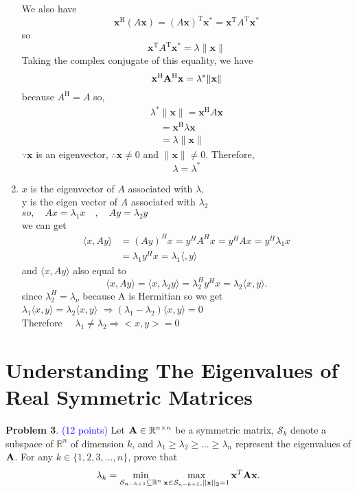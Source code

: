 \documentclass[english,onecolumn]{IEEEtran}
\newcommand{\Rbb}{\mathbb{R}}
\newcommand{\bigS}{\mathcal{S}}
\newcommand{\bA}{{\bf A}}
\newcommand{\bx}{{\bf x}}
\begin{document}
\begin{enumerate}
$$    $$
    We also have
    $$
    \mathbf{x}^{\mathrm{H}}(A \mathbf{x})=(A \mathbf{x})^{\mathrm{T}} \mathbf{x}^{*}=\mathbf{x}^{\mathrm{T}} A^{\mathrm{T}} \mathbf{x}^{*}
    $$
    so
    $$
    \mathbf{x}^{\mathrm{T}} A^{\mathrm{T}} \mathbf{x}^{*}=\lambda\|\mathbf{x}\|
    $$
    Taking the complex conjugate of this equality, we have
    $$
    \mathbf{x}^{\mathrm{H}} \bold{A}^{\mathrm{H}} \mathbf{x}=\lambda^{*}\|\mathbf{x}\|
    $$
    because $A^{\mathrm{H}}=A$ so,
    $$
    \begin{array}{l}
    	\lambda^{*}\|\mathbf{x}\| = \mathbf{x}^{\mathrm{H}} A \mathbf{x} \\
    	\quad = \mathbf{x}^{\mathrm{H}} \lambda \mathbf{x} \\
    	\quad=\lambda\|\mathbf{x}\|
    \end{array}
    $$
    $\because \mathbf{x}$ is an eigenvector, $\therefore \mathbf{x}\ne 0$ and  $\|\mathbf{x}\| \neq 0$.
    Therefore,
    $$
    \lambda=\lambda^{*}
    $$
    
    
    
    
    
    \item
    $x$ is the eigenvector of $A$ associated with $\lambda$,\\
    y is the eigen vector of $A$ associated with $\lambda_{2}$\\
    $so, \quad A x=\lambda_{1} x \quad, \quad A y=\lambda_{2} y$\\
    we can get
    $$
    \begin{aligned}
    	\langle x, A y\rangle &=(A y)^{H} x=y^{H} A^{H} x=y^{H} A x=y^{H} \lambda_{1} x \\
    	&=\lambda_{1} y^{H} x=\lambda_{1}\langle, y\rangle
    \end{aligned}
    $$
    and $\langle x, A y\rangle$ also equal to
    $$
    \langle x, A y\rangle=\langle x, \lambda_{2} y\rangle=\lambda_{2}^{H} y^{H} x=\lambda_{2}\langle x, y\rangle.
    $$
    since $\lambda_{2}^{H}=\lambda_{\nu}$ because A is Hermitian
    so we get\\
    $\lambda_{1}\langle x, y\rangle=\lambda_{2}\langle x, y\rangle$
    $\Rightarrow\left(\lambda_{1}-\lambda_{2}\right)\langle x, y\rangle=0$\\
    Therefore $\quad \lambda_{1} \neq \lambda_{2} \Rightarrow<x, y>=0$
\end{enumerate}

\clearpage
\section{Understanding The Eigenvalues of Real Symmetric Matrices}
\noindent\textbf{Problem 3}. \textcolor{blue}{(12 points)}
\noindent 
Let $\bA\in \Rbb^{n\times n}$ be a symmetric matrix, $\bigS_k$ denote a subspace of $\Rbb^n$ of dimension $k$, and $\lambda_1\geq \lambda_2\geq...\geq \lambda_n$ represent the eigenvalues of $\bA$. 
For any $k\in\{1,2,3,...,n\}$, prove that \[\lambda_k=\min\limits_{\bigS_{n-k+1}\subseteq \Rbb^n}\max\limits_{\bx\in\bigS_{n-k+1},||\bx||_2=1} \bx^T\bA\bx.\]
\end{document}

